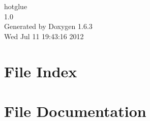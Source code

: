 \documentclass[a4paper]{book}
\begin{document}
\hypersetup{pageanchor=false}
\begin{titlepage}
\vspace*{7cm}
\begin{center}
{\Large hotglue \\[1ex]\large 1.0 }\\
\vspace*{1cm}
{\large Generated by Doxygen 1.6.3}\\
\vspace*{0.5cm}
{\small Wed Jul 11 19:43:16 2012}\\
\end{center}
\end{titlepage}
\clearemptydoublepage
{}
\tableofcontents
\clearemptydoublepage
{}
\hypersetup{pageanchor=true}
\chapter{File Index}

\chapter{File Documentation}


























\printindex
\end{document}
